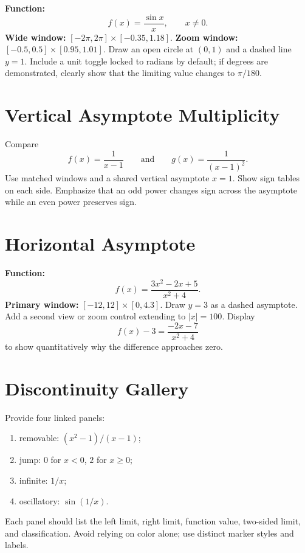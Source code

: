 \documentclass[11pt,openany]{book}
\theoremstyle{bgplain}
\begin{document}
\begin{bggraphspec}
\textbf{Function:}
\[
  f(x)=\frac{\sin x}{x},\qquad x\ne0.
\]
\textbf{Wide window:} \([-2\pi,2\pi]\times[-0.35,1.18]\). \textbf{Zoom window:} \([-0.5,0.5]\times[0.95,1.01]\). Draw an open circle at \((0,1)\) and a dashed line \(y=1\). Include a unit toggle locked to radians by default; if degrees are demonstrated, clearly show that the limiting value changes to \(\pi/180\).
\end{bggraphspec}

\section{Vertical Asymptote Multiplicity}

\begin{bggraphspec}
Compare
\[
  f(x)=\frac1{x-1}
  \qquad\text{and}\qquad
  g(x)=\frac1{(x-1)^2}.
\]
Use matched windows and a shared vertical asymptote \(x=1\). Show sign tables on each side. Emphasize that an odd power changes sign across the asymptote while an even power preserves sign.
\end{bggraphspec}

\section{Horizontal Asymptote}

\begin{bggraphspec}
\textbf{Function:}
\[
  f(x)=\frac{3x^2-2x+5}{x^2+4}.
\]
\textbf{Primary window:} \([-12,12]\times[0,4.3]\). Draw \(y=3\) as a dashed asymptote. Add a second view or zoom control extending to \(|x|=100\). Display
\[
  f(x)-3=\frac{-2x-7}{x^2+4}
\]
to show quantitatively why the difference approaches zero.
\end{bggraphspec}

\section{Discontinuity Gallery}

\begin{bggraphspec}
Provide four linked panels:
\begin{enumerate}
  \item removable: \((x^2-1)/(x-1)\);
  \item jump: \(0\) for \(x<0\), \(2\) for \(x\ge0\);
  \item infinite: \(1/x\);
  \item oscillatory: \(\sin(1/x)\).
\end{enumerate}
Each panel should list the left limit, right limit, function value, two-sided limit, and classification. Avoid relying on color alone; use distinct marker styles and labels.
\end{bggraphspec}
\end{document}
